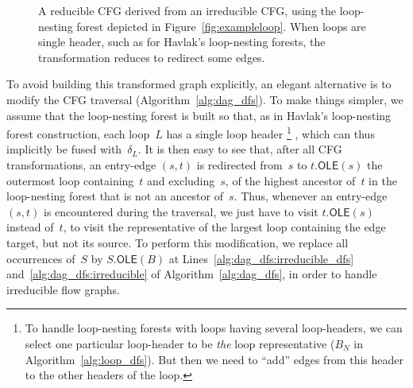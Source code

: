 \begin{figure}[t]
  \begin{center}
    \hspace{4mm}
    \hspace{4mm}
  \end{center}
  \caption{%
	  A reducible CFG derived from an irreducible CFG, using the loop-nesting forest depicted in Figure~\ref{fig:exampleloop}.
	  When loops are single header, such as for Havlak's loop-nesting forests, the transformation reduces to redirect some edges.}
  \label{fig:examplecfg}
\end{figure}


\newcommand{\OLE}[2]{#1.\textsf{OLE}(#2)}

To avoid building this transformed graph explicitly, an elegant alternative is to modify the CFG traversal (Algorithm~\ref{alg:dag_dfs}).
To make things simpler, we assume that the loop-nesting forest is built so that, as in Havlak's loop-nesting forest construction, each loop~$L$ has a single loop header%
\footnote{%
	To handle loop-nesting forests with loops having several loop-headers, we can select one particular loop-header to be \emph{the} loop representative ($B_N$ in Algorithm~\ref{alg:loop_dfs}).
	But then we need to ``add'' edges from this header to the other headers of the loop.
}
, which can thus implicitly be fused with~$\delta_L$.
It is then easy to see that, after all CFG transformations, an entry-edge $(s,t)$ is redirected from~$s$ to $\OLE{t}{s}$ the outermost loop containing~$t$ and excluding~$s$, \ie of the highest ancestor of~$t$ in the loop-nesting forest that is not an ancestor of~$s$.
Thus, whenever an entry-edge $(s,t)$ is encountered during the traversal, we just have to visit $\OLE{t}{s}$ instead of~$t$, \ie to visit the representative of the largest loop containing the edge target, but not its source.
To perform this modification, we replace all occurrences of~$S$ by $\OLE{S}{B}$ at Lines~\ref{alg:dag_dfs:irreducible_dfs} and~\ref{alg:dag_dfs:irreducible} of Algorithm~\ref{alg:dag_dfs}, in order to handle irreducible flow graphs.


